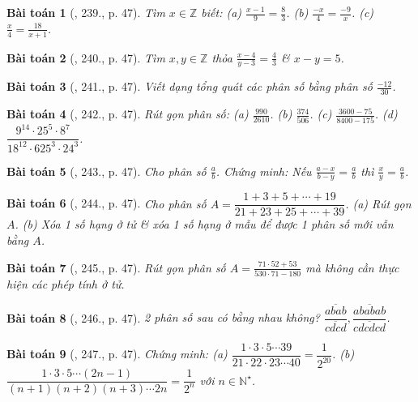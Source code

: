 \documentclass{article}
\newtheorem{baitoan}{Bài toán}
\begin{document}
\begin{baitoan}[\cite{Tuyen_Toan_6}, 239., p. 47]
	Tìm $x\in\mathbb{Z}$ biết: (a) $\frac{x - 1}{9} = \frac{8}{3}$. (b) $\frac{-x}{4} = \frac{-9}{x}$. (c) $\frac{x}{4} = \frac{18}{x + 1}$.
\end{baitoan}

\begin{baitoan}[\cite{Tuyen_Toan_6}, 240., p. 47]
	Tìm $x,y\in\mathbb{Z}$ thỏa $\frac{x - 4}{y - 3} = \frac{4}{3}$ \& $x - y = 5$.
\end{baitoan}

\begin{baitoan}[\cite{Tuyen_Toan_6}, 241., p. 47]
	Viết dạng tổng quát các phân số bằng phân số $\frac{-12}{30}$.
\end{baitoan}

\begin{baitoan}[\cite{Tuyen_Toan_6}, 242., p. 47]
	Rút gọn phân số: (a) $\frac{990}{2610}$. (b) $\frac{374}{506}$. (c) $\frac{3600 - 75}{8400 - 175}$. (d) $\dfrac{9^{14}\cdot25^5\cdot8^7}{18^{12}\cdot625^3\cdot24^3}$.
\end{baitoan}

\begin{baitoan}[\cite{Tuyen_Toan_6}, 243., p. 47]
	Cho phân số $\frac{a}{b}$. Chứng minh: Nếu $\frac{a - x}{b - y} = \frac{a}{b}$ thì $\frac{x}{y} = \frac{a}{b}$.
\end{baitoan}

\begin{baitoan}[\cite{Tuyen_Toan_6}, 244., p. 47]
	Cho phân số $A = \dfrac{1 + 3 + 5 + \cdots + 19}{21 + 23 + 25 + \cdots + 39}$. (a) Rút gọn $A$. (b) Xóa 1 số hạng ở tử \& xóa 1 số hạng ở mẫu để được 1 phân số mới vẫn bằng $A$.
\end{baitoan}

\begin{baitoan}[\cite{Tuyen_Toan_6}, 245., p. 47]
	Rút gọn phân số $A = \frac{71\cdot52 + 53}{530\cdot71 - 180}$ mà không cần thực hiện các phép tính ở tử.
\end{baitoan}

\begin{baitoan}[\cite{Tuyen_Toan_6}, 246., p. 47]
	2 phân số sau có bằng nhau không? $\dfrac{\overline{abab}}{\overline{cdcd}},\dfrac{\overline{ababab}}{\overline{cdcdcd}}$.
\end{baitoan}

\begin{baitoan}[\cite{Tuyen_Toan_6}, 247., p. 47]
	Chứng minh: (a) $\dfrac{1\cdot3\cdot5\cdots39}{21\cdot22\cdot23\cdots40} = \dfrac{1}{2^{20}}$. (b) $\dfrac{1\cdot3\cdot5\cdots(2n - 1)}{(n + 1)(n + 2)(n + 3)\cdots2n} = \dfrac{1}{2^n}$ với $n\in\mathbb{N}^\star$.
\end{baitoan}
\end{document}
